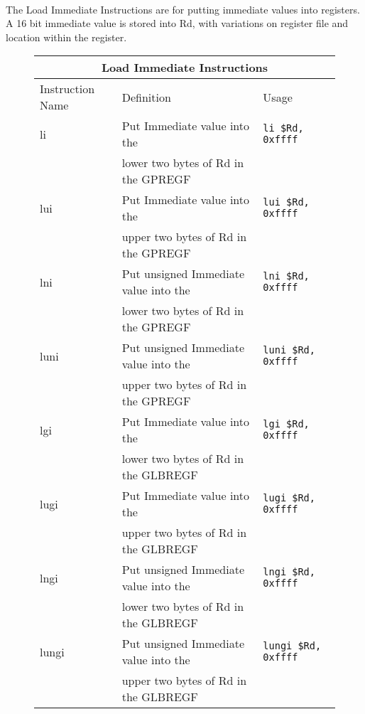 \documentclass[letterpaper, 11pt]{article}
\begin{document}
\paragraph{} The Load Immediate Instructions are for putting immediate values into registers. A 16 bit immediate value is stored into Rd, with variations on
register file and location within the register.
\begin{figure}[!h]
	\begin{center}
		\begin{tabular}{|l|l|l|}
			\hline
			\multicolumn{3}{c}{Load Immediate Instructions} \\ \hline
			Instruction Name	& Definition								& Usage 						\\ \hline
			li					& Put Immediate value into the 				& \texttt{li \$Rd, 0xffff}		\\ 
			\hfill				& lower two bytes of Rd in the GPREGF		& \hfill						\\ \hline
			lui					& Put Immediate value into the  			& \texttt{lui \$Rd, 0xffff}		\\ 	
			\hfill				& upper two bytes of Rd in the GPREGF		& \hfill 						\\ \hline
			lni					& Put unsigned Immediate value into the		& \texttt{lni \$Rd, 0xffff}		\\ 
			\hfill				& lower two bytes of Rd in the GPREGF		& \hfill						\\ \hline
			luni				& Put unsigned Immediate value into the		& \texttt{luni \$Rd, 0xffff}	\\ 
			\hfill				& upper two bytes of Rd in the GPREGF		& \hfill 						\\ \hline

			lgi					& Put Immediate value into the 				& \texttt{lgi \$Rd, 0xffff}		\\ 
			\hfill				& lower two bytes of Rd in the GLBREGF		& \hfill						\\ \hline
			lugi				& Put Immediate value into the 				& \texttt{lugi \$Rd, 0xffff}	\\ 
			\hfill				& upper two bytes of Rd in the GLBREGF		& \hfill						\\ \hline
			lngi				& Put unsigned Immediate value into the		& \texttt{lngi \$Rd, 0xffff}	\\ 
			\hfill				& lower two bytes of Rd in the GLBREGF		& \hfill						\\ \hline
			lungi				& Put unsigned Immediate value into the 	& \texttt{lungi \$Rd, 0xffff}	\\ 
			\hfill				& upper two bytes of Rd in the GLBREGF		& \hfill						\\ \hline



\end{tabular}
\end{center}
\end{figure}
\end{document}
